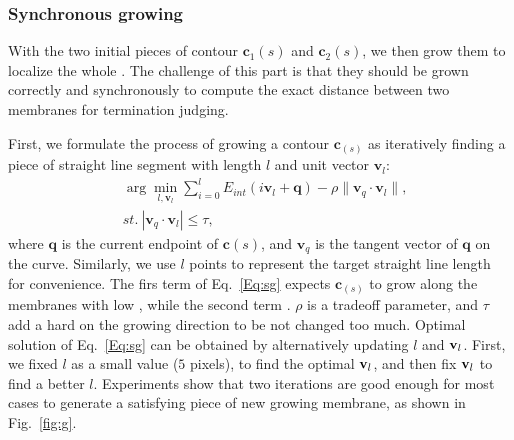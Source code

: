 \subsubsection{Synchronous growing}

With the two initial pieces of contour $\mathbf{c}_1(s)$ and $\mathbf{c}_2(s)$, we then grow them to localize the whole .
The challenge of this part is that they should be grown correctly and synchronously to compute the exact distance between two membranes for termination judging.

First, we formulate the process of growing a contour $\mathbf{c}_(s)$ as iteratively finding a piece of straight line segment with length $l$ and unit vector $\mathbf{v}_l$:
\begin{eqnarray}\label{Eq:sg}
&\arg\min\limits_{l,\mathbf{v}_l} \sum\limits_{i=0}^{l}E_{int}(i\mathbf{v}_l+\mathbf{q}) -\rho\|\mathbf{v}_q \cdot \mathbf{v}_l\|,\\
&st.~ |\mathbf{v}_q \cdot \mathbf{v}_l| \leq \tau, \nonumber
\end{eqnarray}
where $\mathbf{q}$ is the current endpoint of $\mathbf{c}(s)$, and $\mathbf{v}_{q}$ is the tangent vector of $\mathbf{q}$ on the curve.
%
Similarly, we use $l$ points to represent the target straight line length for convenience.
The firs term of Eq.~\ref{Eq:sg} expects $\mathbf{c}_(s)$ to grow along the membranes with low , while the second term .
$\rho$ is a tradeoff parameter, and $\tau$ add a hard  on the growing direction to be not changed too much.
%
Optimal solution of Eq.~\ref{Eq:sg} can be obtained by alternatively updating $l$ and $\mathbf{v}_l$.
First, we fixed $l$ as a small value ($5$ pixels), to find the optimal $\mathbf{v}_l$, and then fix $\mathbf{v}_l$ to find a better $l$.
Experiments show that two iterations are good enough for most cases to generate a satisfying piece of new growing membrane, as shown in Fig.~\ref{fig:g}.

